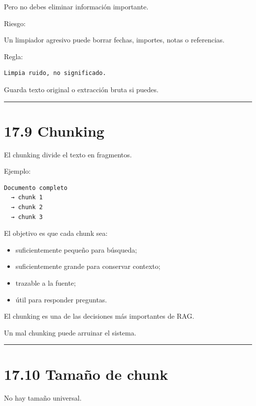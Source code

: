 Pero no debes eliminar información importante.

Riesgo:

Un limpiador agresivo puede borrar fechas, importes, notas o
referencias.

Regla:

\begin{lstlisting}
Limpia ruido, no significado.
\end{lstlisting}

Guarda texto original o extracción bruta si puedes.

\begin{center}\rule{0.5\linewidth}{0.5pt}\end{center}

\section{17.9 Chunking}\label{chunking-1}

El chunking divide el texto en fragmentos.

Ejemplo:

\begin{lstlisting}
Documento completo
  → chunk 1
  → chunk 2
  → chunk 3
\end{lstlisting}

El objetivo es que cada chunk sea:

\begin{itemize}
\tightlist
\item
  suficientemente pequeño para búsqueda;
\item
  suficientemente grande para conservar contexto;
\item
  trazable a la fuente;
\item
  útil para responder preguntas.
\end{itemize}

El chunking es una de las decisiones más importantes de RAG.

Un mal chunking puede arruinar el sistema.

\begin{center}\rule{0.5\linewidth}{0.5pt}\end{center}

\section{17.10 Tamaño de chunk}\label{tamauxf1o-de-chunk}

No hay tamaño universal.

